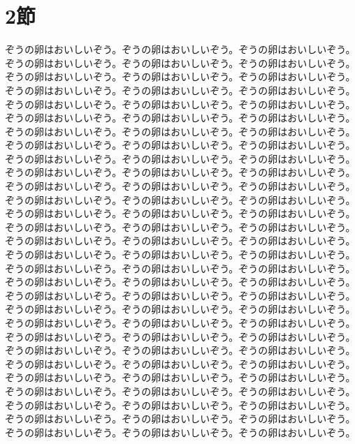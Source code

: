 \section*{2節}
ぞうの卵はおいしいぞう。ぞうの卵はおいしいぞう。ぞうの卵はおいしいぞう。ぞうの卵はおいしいぞう。ぞうの卵はおいしいぞう。ぞうの卵はおいしいぞう。ぞうの卵はおいしいぞう。ぞうの卵はおいしいぞう。ぞうの卵はおいしいぞう。ぞうの卵はおいしいぞう。ぞうの卵はおいしいぞう。ぞうの卵はおいしいぞう。ぞうの卵はおいしいぞう。ぞうの卵はおいしいぞう。ぞうの卵はおいしいぞう。ぞうの卵はおいしいぞう。ぞうの卵はおいしいぞう。ぞうの卵はおいしいぞう。ぞうの卵はおいしいぞう。ぞうの卵はおいしいぞう。ぞうの卵はおいしいぞう。ぞうの卵はおいしいぞう。ぞうの卵はおいしいぞう。ぞうの卵はおいしいぞう。ぞうの卵はおいしいぞう。ぞうの卵はおいしいぞう。ぞうの卵はおいしいぞう。ぞうの卵はおいしいぞう。ぞうの卵はおいしいぞう。ぞうの卵はおいしいぞう。ぞうの卵はおいしいぞう。ぞうの卵はおいしいぞう。ぞうの卵はおいしいぞう。ぞうの卵はおいしいぞう。ぞうの卵はおいしいぞう。ぞうの卵はおいしいぞう。ぞうの卵はおいしいぞう。ぞうの卵はおいしいぞう。ぞうの卵はおいしいぞう。ぞうの卵はおいしいぞう。ぞうの卵はおいしいぞう。ぞうの卵はおいしいぞう。ぞうの卵はおいしいぞう。ぞうの卵はおいしいぞう。ぞうの卵はおいしいぞう。ぞうの卵はおいしいぞう。ぞうの卵はおいしいぞう。ぞうの卵はおいしいぞう。ぞうの卵はおいしいぞう。ぞうの卵はおいしいぞう。ぞうの卵はおいしいぞう。ぞうの卵はおいしいぞう。ぞうの卵はおいしいぞう。ぞうの卵はおいしいぞう。ぞうの卵はおいしいぞう。ぞうの卵はおいしいぞう。ぞうの卵はおいしいぞう。ぞうの卵はおいしいぞう。ぞうの卵はおいしいぞう。ぞうの卵はおいしいぞう。ぞうの卵はおいしいぞう。ぞうの卵はおいしいぞう。ぞうの卵はおいしいぞう。ぞうの卵はおいしいぞう。ぞうの卵はおいしいぞう。ぞうの卵はおいしいぞう。ぞうの卵はおいしいぞう。ぞうの卵はおいしいぞう。ぞうの卵はおいしいぞう。ぞうの卵はおいしいぞう。ぞうの卵はおいしいぞう。ぞうの卵はおいしいぞう。ぞうの卵はおいしいぞう。ぞうの卵はおいしいぞう。ぞうの卵はおいしいぞう。ぞうの卵はおいしいぞう。ぞうの卵はおいしいぞう。ぞうの卵はおいしいぞう。ぞうの卵はおいしいぞう。ぞうの卵はおいしいぞう。ぞうの卵はおいしいぞう。ぞうの卵はおいしいぞう。ぞうの卵はおいしいぞう。ぞうの卵はおいしいぞう。ぞうの卵はおいしいぞう。ぞうの卵はおいしいぞう。ぞうの卵はおいしいぞう。